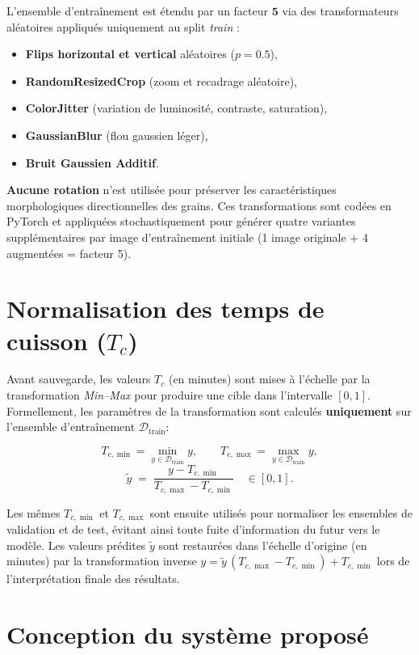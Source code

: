   L'ensemble d'entraînement est étendu par un facteur $\mathbf{5}$ via des transformateurs aléatoires appliqués uniquement au split \emph{train} :
  \begin{itemize}
      \item \textbf{Flips horizontal et vertical} aléatoires ($p=0.5$),
      \item \textbf{RandomResizedCrop} (zoom et recadrage aléatoire),
      \item \textbf{ColorJitter} (variation de luminosité, contraste, saturation),
      \item \textbf{GaussianBlur} (flou gaussien léger),
      \item \textbf{Bruit Gaussien Additif}.
  \end{itemize}
  \textbf{Aucune rotation} n'est utilisée pour préserver les caractéristiques morphologiques directionnelles des grains. Ces transformations sont codées en PyTorch et appliquées stochastiquement pour générer quatre variantes supplémentaires par image d'entraînement initiale (1 image originale + 4 augmentées = facteur 5).

\section{\texorpdfstring{Normalisation des temps de cuisson ($T_c$)}{Normalisation des temps de cuisson (Tc)}}


  Avant sauvegarde, les valeurs $T_c$ (en minutes) sont mises à l'échelle par la transformation \emph{Min–Max} pour produire une cible dans l'intervalle $[0,1]$. Formellement, les paramètres de la transformation sont calculés \textbf{uniquement} sur l'ensemble d'entraînement $\mathcal{D}_{\text{train}}$:

  \[
  T_{c,\min} = \min_{y\in \mathcal{D}_{\text{train}}} y, \qquad
  T_{c,\max} = \max_{y\in \mathcal{D}_{\text{train}}} y,
  \]
  \[
  \tilde{y} \;=\; \frac{y - T_{c,\min}}{T_{c,\max} - T_{c,\min}} \quad\in[0,1].
  \]

  Les mêmes $T_{c,\min}$ et $T_{c,\max}$ sont ensuite utilisés pour normaliser les ensembles de validation et de test, évitant ainsi toute fuite d'information du futur vers le modèle. Les valeurs prédites $\tilde{y}$ sont restaurées dans l'échelle d'origine (en minutes) par la transformation inverse $y = \tilde{y}\,(T_{c,\max}-T_{c,\min}) + T_{c,\min}$ lors de l'interprétation finale des résultats.

  \section{Conception du système proposé}

